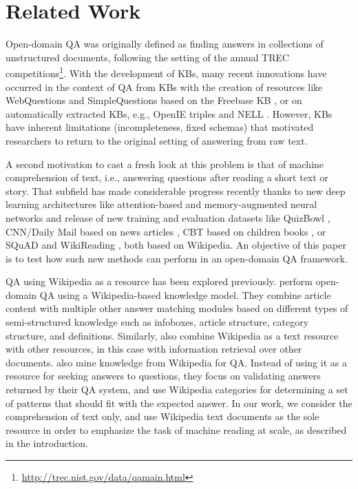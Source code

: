 \documentclass[11pt,a4paper]{article}
\begin{document}
\section{Related Work} \label{sec:rwork}

Open-domain QA was originally defined as finding answers in collections of unstructured documents, following the setting of the annual TREC competitions\footnote{\url{http://trec.nist.gov/data/qamain.html}}.
With the development of KBs, many recent innovations have occurred in the context of QA from KBs with the creation of resources like WebQuestions \cite{berant2013semantic} and SimpleQuestions \cite{bordes2015large} based on the Freebase KB \cite{bollacker2008freebase},
or on automatically extracted KBs, e.g., OpenIE triples and NELL \cite{fader2014open}.
However, KBs have inherent limitations (incompleteness, fixed schemas) that
motivated researchers to return to the original setting of answering from raw text.

A second motivation to cast a fresh look at this problem is that of machine comprehension of text, i.e., answering questions after reading a short text or story. That subfield has made considerable progress recently
thanks to new deep learning architectures like attention-based and memory-augmented neural networks \cite{bahdanau2015neural,weston2015memory,graves2014neural} and release of new training and evaluation datasets like QuizBowl \cite{iyyer2014neural}, CNN/Daily Mail based on news articles \cite{nips2015hermann}, CBT based on children books \cite{hill2015goldilocks}, or SQuAD \cite{rajpurkar2016squad} and WikiReading \cite{hewlett2016wiki}, both based on Wikipedia.
An objective of this paper is to test how such new methods can perform in an open-domain QA framework.


QA using Wikipedia as a resource has been explored previously.
\citet{ryu2014open} perform open-domain QA using a Wikipedia-based knowledge model. They combine article content with multiple other answer matching modules based on different types of semi-structured knowledge such as infoboxes, article structure, category structure, and definitions.
 Similarly, \citet{Ahn04} also combine Wikipedia as a text resource with other resources, in this case with information retrieval over other documents.
\citet{buscaldi2006mining} also mine knowledge from Wikipedia for QA. Instead of using it as a resource for seeking answers to questions, they focus on validating answers returned by their QA system, and use Wikipedia categories for determining a set of patterns that should fit with the expected answer.
In our work, we consider the comprehension of text only, and use Wikipedia text documents as the sole resource in order to emphasize the task of machine reading at scale, as described in the introduction.
\end{document}
